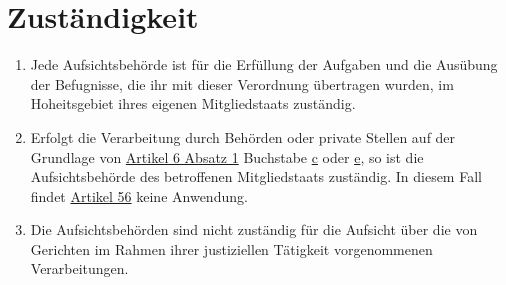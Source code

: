 \chapter{Zuständigkeit}
\label{ch:55}


\begin{enumerate}

  \item Jede Aufsichtsbehörde ist für die Erfüllung der Aufgaben und die Ausübung der Befugnisse, die ihr mit dieser
   Verordnung übertragen wurden, im Hoheitsgebiet ihres eigenen Mitgliedstaats zuständig.
  \label{itm:55-1}

  \item Erfolgt die Verarbeitung durch Behörden oder private Stellen auf der Grundlage von \hyperref[itm:06-1]{Artikel 6
   Absatz 1} Buchstabe \hyperref[itm:06-1c]{c} oder \hyperref[itm:06-1e]{e}, so ist die Aufsichtsbehörde des
   betroffenen Mitgliedstaats zuständig. In diesem Fall findet \hyperref[ch:56]{Artikel 56} keine Anwendung.
  \label{itm:55-2}

  \item Die Aufsichtsbehörden sind nicht zuständig für die Aufsicht über die von Gerichten im Rahmen ihrer justiziellen
   Tätigkeit vorgenommenen Verarbeitungen.
  \label{itm:55-3}

\end{enumerate}


